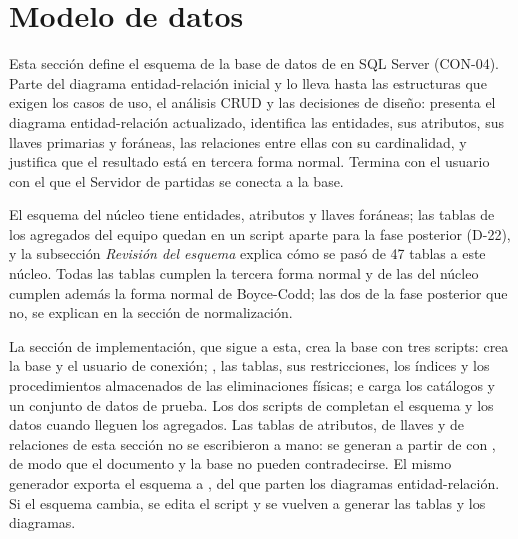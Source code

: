 \section*{Modelo de datos}

Esta sección define el esquema de la base de datos de \sistema{} en SQL Server (\mbox{CON-04}). Parte del diagrama entidad-relación inicial y lo lleva hasta las estructuras que exigen los casos de uso, el análisis CRUD y las decisiones de diseño: presenta el diagrama entidad-relación actualizado, identifica las entidades, sus atributos, sus llaves primarias y foráneas, las relaciones entre ellas con su cardinalidad, y justifica que el resultado está en tercera forma normal. Termina con el usuario con el que el Servidor de partidas se conecta a la base.

El esquema del núcleo tiene \bdNumTablas{} entidades, \bdNumColumnas{} atributos y \bdNumForaneas{} llaves foráneas; las \bdFpNumTablas{} tablas de los agregados del equipo quedan en un script aparte para la fase posterior (\mbox{D-22}), y la subsección \textit{Revisión del esquema} explica cómo se pasó de 47 tablas a este núcleo. Todas las tablas cumplen la tercera forma normal y \bdNumFNBC{} de las del núcleo cumplen además la forma normal de Boyce-Codd; las dos de la fase posterior que no, se explican en la sección de normalización.

La sección de implementación, que sigue a esta, crea la base con tres scripts:  crea la base y el usuario de conexión; , las tablas, sus restricciones, los índices y los procedimientos almacenados de las eliminaciones físicas; e  carga los catálogos y un conjunto de datos de prueba. Los dos scripts de  completan el esquema y los datos cuando lleguen los agregados. Las tablas de atributos, de llaves y de relaciones de esta sección no se escribieron a mano: se generan a partir de  con , de modo que el documento y la base no pueden contradecirse. El mismo generador exporta el esquema a , del que parten los diagramas entidad-relación. Si el esquema cambia, se edita el script y se vuelven a generar las tablas y los diagramas.

